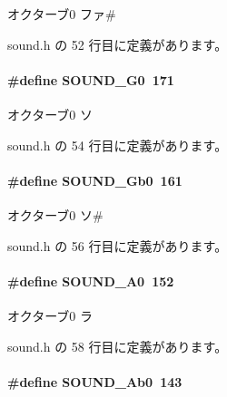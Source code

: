 オクターブ0 ファ\# 



 sound.\+h の 52 行目に定義があります。

\paragraph[{S\+O\+U\+N\+D\+\_\+\+G0}]{\setlength{\rightskip}{0pt plus 5cm}\#define S\+O\+U\+N\+D\+\_\+\+G0~171}\label{sound_8h_a49cb5ffcf2e6a7e6a450e6bb6bb1fd55_a49cb5ffcf2e6a7e6a450e6bb6bb1fd55}


オクターブ0 ソ 



 sound.\+h の 54 行目に定義があります。

\paragraph[{S\+O\+U\+N\+D\+\_\+\+Gb0}]{\setlength{\rightskip}{0pt plus 5cm}\#define S\+O\+U\+N\+D\+\_\+\+Gb0~161}\label{sound_8h_a7f5a3ed6713d6224d6e31d0020fdd430_a7f5a3ed6713d6224d6e31d0020fdd430}


オクターブ0 ソ\# 



 sound.\+h の 56 行目に定義があります。

\paragraph[{S\+O\+U\+N\+D\+\_\+\+A0}]{\setlength{\rightskip}{0pt plus 5cm}\#define S\+O\+U\+N\+D\+\_\+\+A0~152}\label{sound_8h_abcc3b3196f02e1825a756586cff6adb5_abcc3b3196f02e1825a756586cff6adb5}


オクターブ0 ラ 



 sound.\+h の 58 行目に定義があります。

\paragraph[{S\+O\+U\+N\+D\+\_\+\+Ab0}]{\setlength{\rightskip}{0pt plus 5cm}\#define S\+O\+U\+N\+D\+\_\+\+Ab0~143}\label{sound_8h_aa63270be4b563c05e755e9e9c62485d4_aa63270be4b563c05e755e9e9c62485d4}


